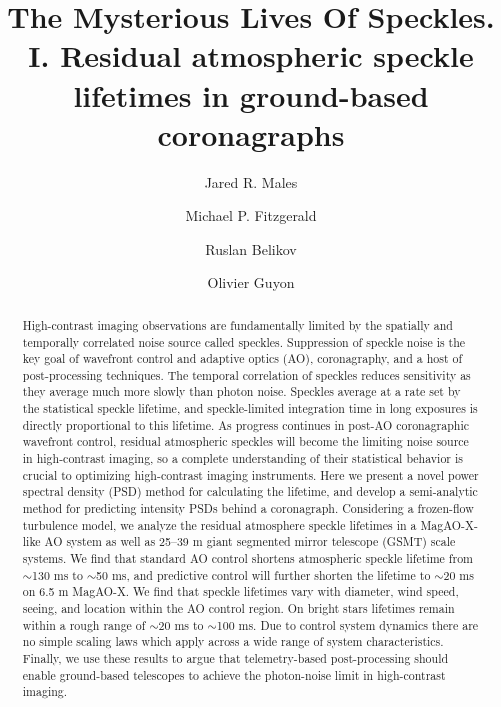 \documentclass[10pt,preprint]{aastex631}
\begin{document}
\title{The Mysterious Lives Of Speckles. I. Residual atmospheric speckle lifetimes in ground-based coronagraphs}

\author{Jared R. Males}

\author[0000-0002-0176-8973]{Michael P. Fitzgerald}

\author{Ruslan Belikov}

\author{Olivier Guyon}

\begin{abstract}
High-contrast imaging observations are fundamentally limited by the spatially and temporally correlated noise source called speckles.  Suppression of speckle noise is the key goal of wavefront control and adaptive optics (AO), coronagraphy, and a host of post-processing techniques.  The temporal correlation of speckles reduces sensitivity as they average much more slowly than photon noise.  Speckles average at a rate set by the statistical speckle lifetime, and speckle-limited integration time in long exposures is directly proportional to this lifetime.  As progress continues in post-AO coronagraphic wavefront control, residual atmospheric speckles will become the limiting noise source in high-contrast imaging, so a complete understanding of their statistical behavior is crucial to optimizing high-contrast imaging instruments. Here we present a novel power spectral density (PSD) method for calculating the lifetime, and develop a semi-analytic method for predicting intensity PSDs behind a coronagraph.  Considering a frozen-flow turbulence model, we analyze the residual atmosphere speckle lifetimes in a MagAO-X-like AO system as well as 25--39 m giant segmented mirror telescope (GSMT) scale systems.  We find that standard AO control shortens atmospheric speckle lifetime from $\sim$130 ms to $\sim$50 ms, and predictive control will further shorten the lifetime to $\sim$20 ms on 6.5 m MagAO-X. We find that speckle lifetimes vary with diameter, wind speed, seeing, and location within the AO control region.  On bright stars lifetimes remain within a rough range of $\sim$20 ms to $\sim$100 ms.  Due to control system dynamics there are no simple scaling laws which apply across a wide range of system characteristics.  Finally, we use these results to argue that telemetry-based post-processing should enable ground-based telescopes to achieve the photon-noise limit in high-contrast imaging.
\end{abstract}
\end{document}
